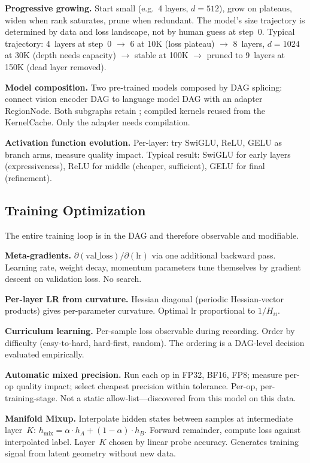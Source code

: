 \textbf{Progressive growing.}
Start small (e.g.\ 4 layers, $d{=}512$), grow on plateaus, widen when rank saturates, prune when redundant.
The model's size trajectory is determined by data and loss landscape, not by human guess at step~0.
Typical trajectory: 4~layers at step~0 $\to$ 6 at 10K (loss plateau) $\to$ 8~layers, $d{=}1024$ at 30K (depth needs capacity) $\to$ stable at 100K $\to$ pruned to 9~layers at 150K (dead layer removed).

\textbf{Model composition.}
Two pre-trained models composed by DAG splicing: connect vision encoder DAG to language model DAG with an adapter RegionNode.
Both subgraphs retain ; compiled kernels reused from the KernelCache.
Only the adapter needs compilation.

\textbf{Activation function evolution.}
Per-layer: try SwiGLU, ReLU, GELU as branch arms, measure quality impact.
Typical result: SwiGLU for early layers (expressiveness), ReLU for middle (cheaper, sufficient), GELU for final (refinement).

\subsection{Training Optimization}

The entire training loop is in the DAG and therefore observable and modifiable.

\textbf{Meta-gradients.}
$\partial(\text{val\_loss})/\partial(\text{lr})$ via one additional backward pass.
Learning rate, weight decay, momentum parameters tune themselves by gradient descent on validation loss.
No search.

\textbf{Per-layer LR from curvature.}
Hessian diagonal (periodic Hessian-vector products) gives per-parameter curvature.
Optimal lr proportional to $1/H_{ii}$.

\textbf{Curriculum learning.}
Per-sample loss observable during recording.
Order by difficulty (easy-to-hard, hard-first, random).
The ordering is a DAG-level decision evaluated empirically.

\textbf{Automatic mixed precision.}
Run each op in FP32, BF16, FP8; measure per-op quality impact; select cheapest precision within tolerance.
Per-op, per-training-stage.
Not a static allow-list---discovered from this model on this data.

\textbf{Manifold Mixup.}
Interpolate hidden states between samples at intermediate layer~$K$: $h_\text{mix} = \alpha \cdot h_A + (1 - \alpha) \cdot h_B$.
Forward remainder, compute loss against interpolated label.
Layer~$K$ chosen by linear probe accuracy.
Generates training signal from latent geometry without new data.

